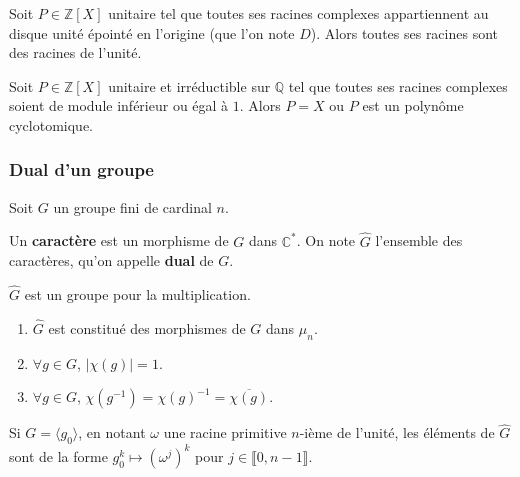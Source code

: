 
  \begin{theorem}[Kronecker]
    Soit $P \in \mathbb{Z}[X]$ unitaire tel que toutes ses racines complexes appartiennent au disque unité épointé en l'origine (que l'on note $D$). Alors toutes ses racines sont des racines de l'unité.
  \end{theorem}

  \begin{corollary}
    Soit $P \in \mathbb{Z}[X]$ unitaire et irréductible sur $\mathbb{Q}$ tel que toutes ses racines complexes soient de module inférieur ou égal à $1$. Alors $P = X$ ou $P$ est un polynôme cyclotomique.
  \end{corollary}

  \subsubsection{Dual d'un groupe}

  Soit $G$ un groupe fini de cardinal $n$.


  \begin{definition}
    Un \textbf{caractère} est un morphisme de $G$ dans $\mathbb{C}^*$. On note $\widehat{G}$ l'ensemble des caractères, qu'on appelle \textbf{dual} de $G$.
  \end{definition}

  \begin{proposition}
    $\widehat{G}$ est un groupe pour la multiplication.
  \end{proposition}

  \begin{proposition}
    \begin{enumerate}[label=(\roman*)]
      \item $\widehat{G}$ est constitué des morphismes de $G$ dans $\mu_n$.
      \item $\forall g \in G$, $\vert \chi(g) \vert = 1$.
      \item $\forall g \in G$, $\chi(g^{-1}) = \chi(g)^{-1} = \overline{\chi(g)}$.
    \end{enumerate}
  \end{proposition}

  \begin{proposition}
    Si $G = \langle g_0 \rangle$, en notant $\omega$ une racine primitive $n$-ième de l'unité, les éléments de $\widehat{G}$ sont de la forme $g_0^k \mapsto (\omega^j)^k$ pour $j \in \llbracket 0, n-1 \rrbracket$.
  \end{proposition}


